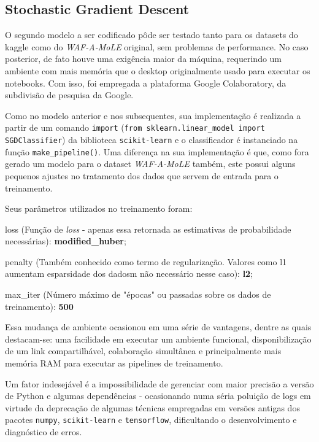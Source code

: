 \label{sec:codigos:modelos}
\bigskip

\subsection{Stochastic Gradient Descent}
O segundo modelo a ser codificado pôde ser testado tanto para os datasets do kaggle como do \textit{WAF-A-MoLE} original, sem problemas de performance. No caso posterior, de fato houve uma exigência maior da máquina, requerindo um ambiente com mais memória que o desktop originalmente usado para executar os notebooks. Com isso, foi empregada a plataforma Google Colaboratory, da subdivisão de pesquisa da Google. 

Como no modelo anterior e nos subsequentes, sua implementação é realizada a partir de um comando \verb+import+ (\verb+from sklearn.linear_model import SGDClassifier+) da biblioteca \verb+scikit-learn+ e o classificador é instanciado na função \verb+make_pipeline()+. Uma diferença na sua implementação é que, como fora gerado um modelo para o dataset \textit{WAF-A-MoLE} também, este possui alguns pequenos ajustes no tratamento dos dados que servem de entrada para o treinamento.

Seus parâmetros utilizados no treinamento foram:
\begin{alineas}
    \item loss (Função de \textit{loss} - apenas essa retornada as estimativas de probabilidade necessárias): \textbf{modified\_huber};
    \item penalty (Também conhecido como termo de regularização. Valores como l1 aumentam esparsidade dos dadosm não necessário nesse caso): \textbf{l2};
    \item max\_iter (Número máximo de "épocas" ou passadas sobre os dados de treinamento): \textbf{500}
\end{alineas}


Essa mudança de ambiente ocasionou em uma série de vantagens, dentre as quais destacam-se: uma facilidade em executar um ambiente funcional, disponibilização de um link compartilhável, colaboração simultânea e principalmente mais memória RAM para executar as pipelines de treinamento. 

Um fator indesejável é a impossibilidade de gerenciar com maior precisão a versão de Python e algumas dependências - ocasionando numa séria poluição de logs em virtude da deprecação de algumas técnicas empregadas em versões antigas dos pacotes \verb+numpy+, \verb+scikit-learn+ e \verb+tensorflow+, dificultando o desenvolvimento e diagnóstico de erros. 

